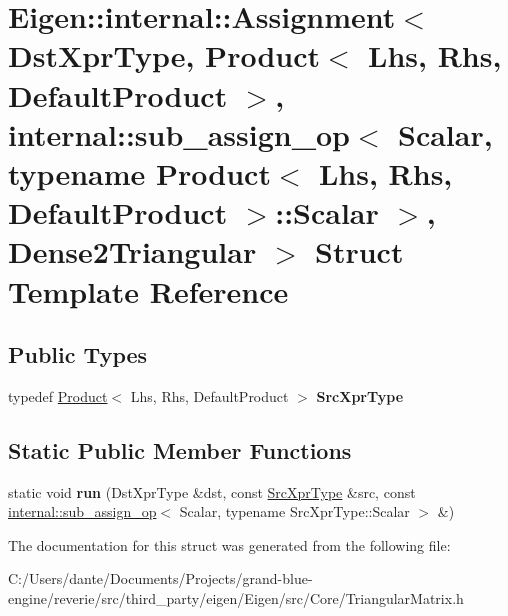 \hypertarget{struct_eigen_1_1internal_1_1_assignment_3_01_dst_xpr_type_00_01_product_3_01_lhs_00_01_rhs_00_01bb8efed27d47832b53496ca7f6c9254b}{}\section{Eigen\+::internal\+::Assignment$<$ Dst\+Xpr\+Type, Product$<$ Lhs, Rhs, Default\+Product $>$, internal\+::sub\+\_\+assign\+\_\+op$<$ Scalar, typename Product$<$ Lhs, Rhs, Default\+Product $>$\+::Scalar $>$, Dense2\+Triangular $>$ Struct Template Reference}
\label{struct_eigen_1_1internal_1_1_assignment_3_01_dst_xpr_type_00_01_product_3_01_lhs_00_01_rhs_00_01bb8efed27d47832b53496ca7f6c9254b}
\subsection*{Public Types}
\begin{DoxyCompactItemize}
\item 
\mbox{\label{struct_eigen_1_1internal_1_1_assignment_3_01_dst_xpr_type_00_01_product_3_01_lhs_00_01_rhs_00_01bb8efed27d47832b53496ca7f6c9254b_afaf3ea3984def04214841fd080dedbb6}} 
typedef \mbox{\hyperlink{class_eigen_1_1_product}{Product}}$<$ Lhs, Rhs, Default\+Product $>$ {\bfseries Src\+Xpr\+Type}
\end{DoxyCompactItemize}
\subsection*{Static Public Member Functions}
\begin{DoxyCompactItemize}
\item 
\mbox{\label{struct_eigen_1_1internal_1_1_assignment_3_01_dst_xpr_type_00_01_product_3_01_lhs_00_01_rhs_00_01bb8efed27d47832b53496ca7f6c9254b_a0e60cd1a3ddaf3a1c3b159c0c70c0662}} 
static void {\bfseries run} (Dst\+Xpr\+Type \&dst, const \mbox{\hyperlink{class_eigen_1_1_product}{Src\+Xpr\+Type}} \&src, const \mbox{\hyperlink{struct_eigen_1_1internal_1_1sub__assign__op}{internal\+::sub\+\_\+assign\+\_\+op}}$<$ Scalar, typename Src\+Xpr\+Type\+::\+Scalar $>$ \&)
\end{DoxyCompactItemize}


The documentation for this struct was generated from the following file\+:\begin{DoxyCompactItemize}
\item 
C\+:/\+Users/dante/\+Documents/\+Projects/grand-\/blue-\/engine/reverie/src/third\+\_\+party/eigen/\+Eigen/src/\+Core/Triangular\+Matrix.\+h\end{DoxyCompactItemize}
